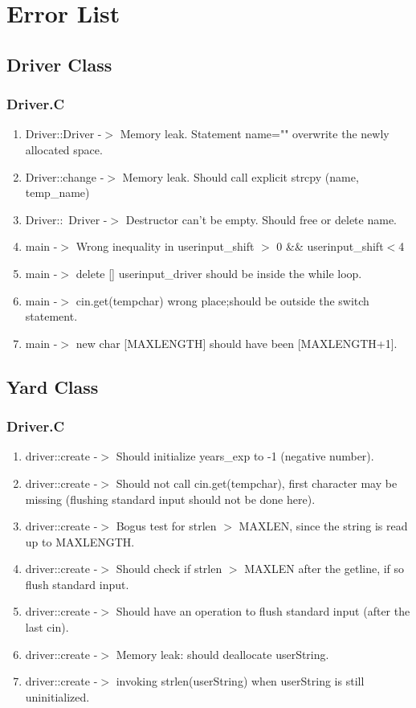 \chapter {Error List}

\section{Driver Class}
\subsection{Driver.C}
\begin {enumerate}
\item Driver::Driver -$>$ Memory leak. Statement name="" overwrite the newly
allocated space.
\item Driver::change -$>$ Memory leak. Should call explicit strcpy (name, temp\_name)
\item Driver::~Driver -$>$ Destructor can't be empty. Should free or
delete name.
\item main -$>$ Wrong inequality in userinput\_shift $>$ 0 \&\&
userinput\_shift$<$4
\item main -$>$ delete [] userinput\_driver should be inside the while loop.
\item main -$>$ cin.get(tempchar) wrong place;should be outside the
switch statement. 
\item main -$>$ new char [MAXLENGTH] should have been [MAXLENGTH+1].
\end{enumerate}


\section{Yard Class}

\subsection{Driver.C}
\begin {enumerate}
\item driver::create -$>$ Should initialize years\_exp to -1 (negative
number). 
\item driver::create -$>$ Should not call cin.get(tempchar), first
character may be missing (flushing standard input should not be done
here). 
\item driver::create -$>$ Bogus test for strlen $>$ MAXLEN, since the
string is read up to MAXLENGTH.
\item driver::create -$>$ Should check if strlen $>$ MAXLEN after the
getline, if so flush standard input.
\item driver::create -$>$ Should have an operation to flush standard
input (after the last cin). 
\item driver::create -$>$ Memory leak: should deallocate userString.
\item driver::create -$>$ invoking strlen(userString) when userString
is still uninitialized.

\end{enumerate}

